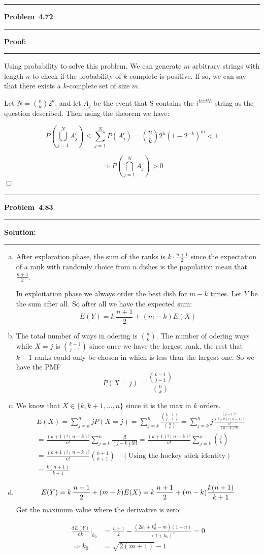 \documentclass[10.5pt]{article}
\newcommand\question[1]{\vspace{.2in}\hrule\vspace{0.04in}\textbf{Problem\ #1}\vspace{.4em}\hrule\vspace{.10in}}
\newcommand\Solution{\vspace{.3in}\textbf{Solution:}\vspace{.5em}\hrule\vspace{.08in}\par}
\newcommand\Proof{\vspace{.3in}\textbf{Proof:}\vspace{.5em}\hrule\vspace{.08in}\par}
\begin{document}
\vspace{2cm}

\question{4.72}
\Proof{}
Using probability to solve this problem. We can generate $m$ arbitrary strings with length $n$ to check if the probability of $k$-complete is positive. If so, we can say that there exists a $k$-complete set of size $m$.

Let $N = \binom{n}{k}2^k$, and let $A_j$ be the event that S contains the $i^{text{th}}$ string as the question described. Then using the theorem we have:

$$P\left(\bigcup_{j = 1}^N A_j^c\right)\leqslant\sum_{j = 1}^N P(A_j^c) = \binom{n}{k}2^k(1-2^{-k})^m<1$$

$$\Rightarrow P\left(\bigcap_{j = 1}^N A_j\right)>0$$ $\Box$

\pagebreak
\question{4.83}
\Solution{}
\begin{enumerate}[(a)]
	\item After exploration phase, the sum of the ranks is $k\cdot\frac{n+1}{2}$ since the expectation of a rank with randomly choice from $n$ dishes is the population mean that $\frac{n+1}{2}$.
	
	In exploitation phase we always order the best dish for $m-k$ times. Let $Y$ be the sum after all. So after all we have the expected sum:
	$$E(Y) = k\,\frac{n+1}{2}+(m-k)E(X)$$
	\vspace{0.5cm}
	\item The total number of ways in odering is $\binom{n}{k}$. The number of odering ways while $X = j$ is $\binom{k-1}{j-1}$ since once we have the largest rank, the rest that $k - 1$ ranks could only be chosen in which is less than the largest one.
	So we have the PMF $$P(X = j) = \frac{\binom{k - 1}{j - 1}}{\binom{n}{k}}$$
	\vspace{0.5cm}
	\item We know that $X\in\{k, k+1, \dots, n\}$ since it is the max in $k$ orders.\begin{align*}
		&E(X) = \sum_{j = k}^n j P(X=j) = \sum_{j = k}^n \frac{\binom{k - 1}{j - 1}}{\binom{n}{k}} = \sum_{j = k}^n j \frac{\frac{(j - 1)!}{(j - k)!(k - 1)!}}{\frac{n!}{(n - k)!k!}}\\[6pt]
		&= \frac{(k+1)!(n - k)!}{n!}\sum_{j = k}^n\frac{j!}{(j - k)!k!} = \frac{(k+1)!(n - k)!}{n!}\sum_{j = k}^n\binom{j}{k}\\[6pt]
		&= \frac{(k+1)!(n - k)!}{n!}\binom{n+1}{k+1}\quad(\text{Using the hockey stick identity})\\[6pt]
		&= \frac{k(n+1)}{k+1}
	\end{align*}\vspace{0.5cm}
	\item $$E(Y) = k\,\frac{n+1}{2}+(m-k)E(X) = k\,\frac{n+1}{2}+(m-k)\frac{k(n+1)}{k+1}\\[6pt]$$
	Get the maximum value where the derivative is zero:

	\begin{align*}
		\frac{\mathrm{d} E(Y)}{\mathrm{d} k}\bigg|_{k_0} &= \frac{n+1}{2}-\frac{(2 k_0 + k_0^2 - m)(1 + n)}{(1 + k_0)^2} = 0\\[8pt]
		\Rightarrow k_0 &= \sqrt{2(m+1)}-1
	\end{align*}
\end{enumerate}
\end{document}

